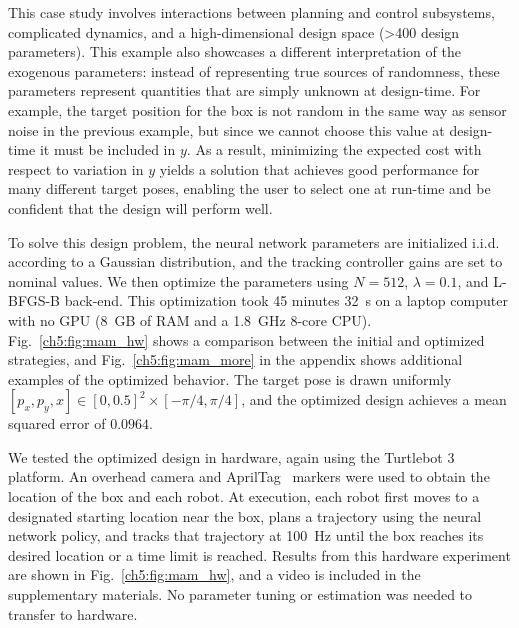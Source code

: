 This case study involves interactions between planning and control subsystems, complicated dynamics, and a high-dimensional design space (>400 design parameters). This example also showcases a different interpretation of the exogenous parameters: instead of representing true sources of randomness, these parameters represent quantities that are simply unknown at design-time. For example, the target position for the box is not random in the same way as sensor noise in the previous example, but since we cannot choose this value at design-time it must be included in $y$. As a result, minimizing the expected cost with respect to variation in $y$ yields a solution that achieves good performance for many different target poses, enabling the user to select one at run-time and be confident that the design will perform well.

To solve this design problem, the neural network parameters are initialized i.i.d. according to a Gaussian distribution, and the tracking controller gains are set to nominal values. We then optimize the parameters using $N = 512$, $\lambda = 0.1$, and L-BFGS-B back-end. This optimization took 45 minutes \SI{32}{s} on a laptop computer with no GPU (\SI{8}{GB} of RAM and a \SI{1.8}{GHz} 8-core CPU). Fig.~\ref{ch5:fig:mam_hw} shows a comparison between the initial and optimized strategies, and Fig.~\ref{ch5:fig:mam_more} in the appendix shows additional examples of the optimized behavior. The target pose is drawn uniformly $[p_x, p_y, x] \in[0, 0.5]^2 \times [-\pi/4, \pi/4]$, and the optimized design achieves a mean squared error of $0.0964$.

We tested the optimized design in hardware, again using the Turtlebot 3 platform. An overhead camera and AprilTag~\cite{olson2011tags} markers were used to obtain the location of the box and each robot. At execution, each robot first moves to a designated starting location near the box, plans a trajectory using the neural network policy, and tracks that trajectory at \SI{100}{Hz} until the box reaches its desired location or a time limit is reached. Results from this hardware experiment are shown in Fig.~\ref{ch5:fig:mam_hw}, and a video is included in the supplementary materials. No parameter tuning or estimation was needed to transfer to hardware.

